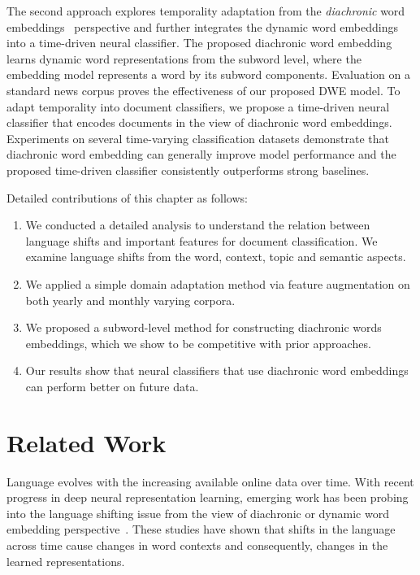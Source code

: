 The second approach explores temporality adaptation from the {\em diachronic} word embeddings~\cite{kutuzov2018diachronic} perspective and further integrates the dynamic word embeddings into a time-driven neural classifier.
The proposed diachronic word embedding learns dynamic word representations from the subword level, where the embedding model represents a word by its subword components. 
Evaluation on a standard news corpus proves the effectiveness of our proposed DWE model. 
To adapt temporality into document classifiers, we propose a time-driven neural classifier that encodes documents in the view of diachronic word embeddings.
Experiments on several time-varying classification datasets demonstrate that diachronic word embedding can generally improve model performance and the proposed time-driven classifier consistently outperforms strong baselines. 

Detailed contributions of this chapter as follows:

\begin{enumerate}
    \item We conducted a detailed analysis to understand the relation between language shifts and important features for document classification. We examine language shifts from the word, context, topic and semantic aspects.
    \item We applied a simple domain adaptation method via feature augmentation on both yearly and monthly varying corpora.
    \item We proposed a subword-level method for constructing diachronic words embeddings, which we show to be competitive with prior approaches. 
    \item Our results show that neural classifiers that use diachronic word embeddings can perform better on future data. 
\end{enumerate}


\section{Related Work}
\label{chap3:sec:survey}

Language evolves with the increasing available online data over time. 
With recent progress in deep neural representation learning, emerging work has been probing into the language shifting issue from the view of diachronic or dynamic word embedding perspective~\cite{tang2018state, kutuzov2018diachronic}.
These studies have shown that shifts in the language across time cause changes in word contexts and consequently, changes in the learned representations. 

